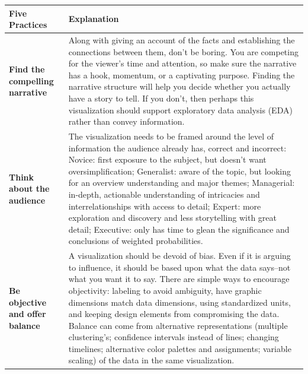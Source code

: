 \documentclass[]{book}
\begin{document}
\begin{longtable}[]{@{}ll@{}}
\toprule
\begin{minipage}[b]{0.19\columnwidth}\raggedright
\textbf{Five Practices}\strut
\end{minipage} & \begin{minipage}[b]{0.75\columnwidth}\raggedright
\textbf{Explanation}\strut
\end{minipage}\tabularnewline
\midrule
\endhead
\begin{minipage}[t]{0.19\columnwidth}\raggedright
\textbf{Find the compelling narrative}\strut
\end{minipage} & \begin{minipage}[t]{0.75\columnwidth}\raggedright
Along with giving an account of the facts and establishing the connections between them, don't be boring. You are competing for the viewer's time and attention, so make sure the narrative has a hook, momentum, or a captivating purpose. Finding the narrative structure will help you decide whether you actually have a story to tell. If you don't, then perhaps this visualization should support exploratory data analysis (EDA) rather than convey information.\strut
\end{minipage}\tabularnewline
\begin{minipage}[t]{0.19\columnwidth}\raggedright
\textbf{Think about the audience}\strut
\end{minipage} & \begin{minipage}[t]{0.75\columnwidth}\raggedright
The visualization needs to be framed around the level of information the audience already has, correct and incorrect: Novice: first exposure to the subject, but doesn't want oversimplification; Generalist: aware of the topic, but looking for an overview understanding and major themes; Managerial: in-depth, actionable understanding of intricacies and interrelationships with access to detail; Expert: more exploration and discovery and less storytelling with great detail; Executive: only has time to glean the significance and conclusions of weighted probabilities.\strut
\end{minipage}\tabularnewline
\begin{minipage}[t]{0.19\columnwidth}\raggedright
\textbf{Be objective and offer balance}\strut
\end{minipage} & \begin{minipage}[t]{0.75\columnwidth}\raggedright
A visualization should be devoid of bias. Even if it is arguing to influence, it should be based upon what the data says--not what you want it to say. There are simple ways to encourage objectivity: labeling to avoid ambiguity, have graphic dimensions match data dimensions, using standardized units, and keeping design elements from compromising the data. Balance can come from alternative representations (multiple clustering's; confidence intervals instead of lines; changing timelines; alternative color palettes and assignments; variable scaling) of the data in the same visualization.\strut

\end{minipage}
\end{longtable}
\end{document}
